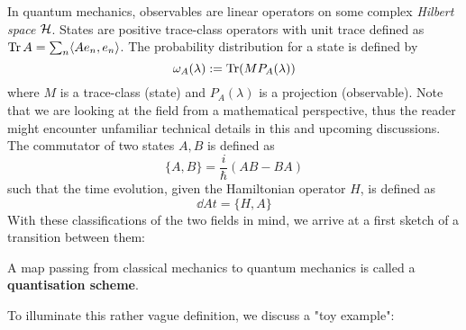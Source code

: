 In quantum mechanics, observables are linear operators on some complex \emph{Hilbert space} ${\mathcal{H}}$. States are positive trace-class operators with unit trace defined as $\operatorname{Tr} A = \sum_n \langle A e_n, e_n \rangle$. The probability distribution for a state is defined by
\begin{equation} \omega_A (\lambda) := \operatorname{Tr}(M P_A(\lambda))\end{equation}
where $M$ is a trace-class (state) and $P_A(\lambda)$ is a projection (observable). Note that we are looking at the field from a mathematical perspective, thus the reader might encounter unfamiliar technical details in this and upcoming discussions.\\
The commutator of two states $A,B$ is defined as
\begin{equation} \{A,B\} = \frac{i}{\hbar} (AB-BA)\end{equation}
such that the time evolution, given the Hamiltonian operator $H$, is defined as
\begin{equation} \dd{A}{t} = \{H,A\}\end{equation}
With these classifications of the two fields in mind, we arrive at a first sketch of a transition between them:

\begin{definition}
  A map passing from classical mechanics to quantum mechanics is called a \textbf{quantisation scheme}.
\end{definition}

To illuminate this rather vague definition, we discuss a "toy example":

